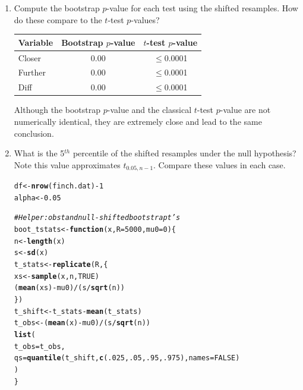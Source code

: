 \documentclass{article}\usepackage[]{graphicx}\usepackage[]{xcolor}
\makeatletter
\newcommand{\hlnum}[1]{\textcolor[rgb]{0.686,0.059,0.569}{#1}}%
\newcommand{\hlcom}[1]{\textcolor[rgb]{0.678,0.584,0.686}{\textit{#1}}}%
\newcommand{\hlopt}[1]{\textcolor[rgb]{0,0,0}{#1}}%
\newcommand{\hldef}[1]{\textcolor[rgb]{0.345,0.345,0.345}{#1}}%
\newcommand{\hlkwa}[1]{\textcolor[rgb]{0.161,0.373,0.58}{\textbf{#1}}}%
\newcommand{\hlkwb}[1]{\textcolor[rgb]{0.69,0.353,0.396}{#1}}%
\newcommand{\hlkwc}[1]{\textcolor[rgb]{0.333,0.667,0.333}{#1}}%
\newcommand{\hlkwd}[1]{\textcolor[rgb]{0.737,0.353,0.396}{\textbf{#1}}}%
\newenvironment{kframe}{%
 \def\at@end@of@kframe{}%
 \ifinner\ifhmode%
  \def\at@end@of@kframe{\end{minipage}}%
  \begin{minipage}{\columnwidth}%
 \fi\fi%
 \def\FrameCommand##1{\hskip\@totalleftmargin \hskip-\fboxsep
 \colorbox{shadecolor}{##1}\hskip-\fboxsep
     \hskip-\linewidth \hskip-\@totalleftmargin \hskip\columnwidth}%
 \MakeFramed {\advance\hsize-\width
   \@totalleftmargin\z@ \linewidth\hsize
   \@setminipage}}%
 {\par\unskip\endMakeFramed%
 \at@end@of@kframe}
\newenvironment{knitrout}{}{} %
\makeatother
\begin{document}
\begin{enumerate}
\begin{enumerate}
  \item Compute the bootstrap $p$-value for each test using the shifted resamples. 
  How do these compare to the $t$-test $p$-values?
  \begin{table}[ht]
\centering
\begin{tabular}{lcc}
  \hline
Variable & Bootstrap $p$-value & $t$-test $p$-value \\ 
  \hline
Closer & 0.00 & $\leq$0.0001 \\ 
  Further & 0.00 & $\leq$0.0001 \\ 
  Diff & 0.00 & $\leq$0.0001 \\ 
   \hline
\end{tabular}
\end{table}
  
  Although the bootstrap $p$-value and the classical $t$-test $p$-value are not numerically identical, they are extremely close and lead to the same conclusion. 
  
  
  
    \item What is the 5$^{th}$ percentile of the shifted resamples under the null hypothesis? 
  Note this value approximates $t_{0.05, n-1}$. Compare these values in each case.
\begin{knitrout}\scriptsize
{}\color{fgcolor}\begin{kframe}
\begin{alltt}
\hldef{df}        \hlkwb{<-} \hlkwd{nrow}\hldef{(finch.dat)} \hlopt{-} \hlnum{1}
\hldef{alpha}     \hlkwb{<-} \hlnum{0.05}

\hlcom{# Helper: obs t and null-shifted bootstrap t’s}
\hldef{boot_tstats} \hlkwb{<-} \hlkwa{function}\hldef{(}\hlkwc{x}\hldef{,} \hlkwc{R} \hldef{=} \hlnum{5000}\hldef{,} \hlkwc{mu0} \hldef{=} \hlnum{0}\hldef{) \{}
\hldef{n}  \hlkwb{<-} \hlkwd{length}\hldef{(x)}
\hldef{s}  \hlkwb{<-} \hlkwd{sd}\hldef{(x)}
\hldef{t_stats} \hlkwb{<-} \hlkwd{replicate}\hldef{(R, \{}
  \hldef{xs} \hlkwb{<-} \hlkwd{sample}\hldef{(x, n,} \hlnum{TRUE}\hldef{)}
  \hldef{(}\hlkwd{mean}\hldef{(xs)} \hlopt{-} \hldef{mu0)}\hlopt{/}\hldef{(s}\hlopt{/}\hlkwd{sqrt}\hldef{(n))}
\hldef{\})}
\hldef{t_shift} \hlkwb{<-} \hldef{t_stats} \hlopt{-} \hlkwd{mean}\hldef{(t_stats)}
\hldef{t_obs}   \hlkwb{<-} \hldef{(}\hlkwd{mean}\hldef{(x)} \hlopt{-} \hldef{mu0)}\hlopt{/}\hldef{(s}\hlopt{/}\hlkwd{sqrt}\hldef{(n))}
\hlkwd{list}\hldef{(}
  \hlkwc{t_obs} \hldef{= t_obs,}
  \hlkwc{qs}    \hldef{=} \hlkwd{quantile}\hldef{(t_shift,} \hlkwd{c}\hldef{(}\hlnum{.025}\hldef{,} \hlnum{.05}\hldef{,} \hlnum{.95}\hldef{,} \hlnum{.975}\hldef{),} \hlkwc{names} \hldef{=} \hlnum{FALSE}\hldef{)}
\hldef{)}
\hldef{\}}


\end{alltt}
\end{kframe}
\end{knitrout}
\end{enumerate}
\end{enumerate}
\end{document}
